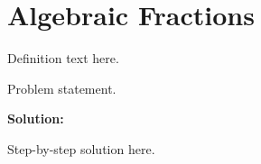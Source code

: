 \section{Algebraic Fractions}


\begin{definition}[Term]
Definition text here.
\end{definition}

\begin{example}
Problem statement.

\textbf{Solution:}

Step-by-step solution here.
\end{example}
